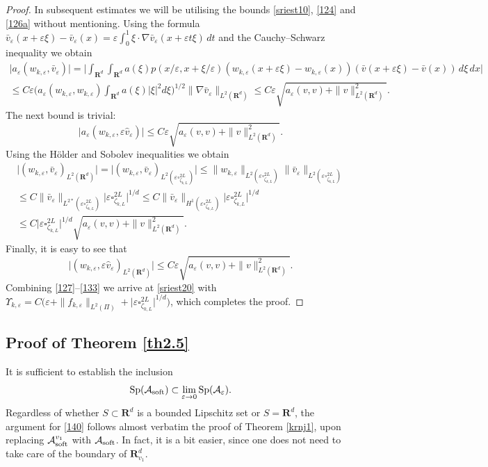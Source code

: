 \documentclass[11pt]{article}
\newcommand\e {\varepsilon}
\newcommand\soft{{\rm soft}}
\def\RR{\R}
\newcommand{\R}{\mathbf{R}}
\def\AA{\mathcal{A}}
\theoremstyle{remark}
\begin{document}
\begin{proof}
In subsequent estimates we will be utilising the bounds \eqref{sriest10}, \eqref{124} and \eqref{126a} without mentioning. Using the formula $ \bar{v}_\e (x+\e \xi)-\bar{v}_\e (x) =\e\int_0^1 \xi \cdot\nabla \bar{v}_\e (x+\e    t \xi) \,dt$ and the  Cauchy–Schwarz inequality   we obtain
	\begin{multline}
	\big| a_\e (w_{k,\e},\bar{v}_\e)\big| = \Big|	\int_{\R^d} \int_{\R^d} a(\xi)p(x/\e, x+\xi/\e)\left(w_{k,\e}(x+\e\xi )-w_{k,\e}(x) \right) \left(\bar{v}(x+\e\xi)-\bar{v}(x) \right)\,d\xi\,dx \Big|
	 \\
	 \leq C \e \Big(a_\e(w_{k,\e},w_{k,\e}) \int_{\R^d} a(\xi) |\xi|^2 d\xi\Big)^{1/2} \|\nabla\bar{v}_\e\|_{L^2(\RR^d)}\leq C \e \sqrt{a_\e (v,v)+\|v\|^2_{L^2(\RR^d)}} .
\end{multline}	
The next bound	  is  trivial:
\begin{equation}
	\big|a_\e(w_{k,\e}, \varepsilon \hat{v}_\e)\big| \leq C \e \sqrt{a_\e (v,v)+\|v\|^2_{L^2(\RR^d)}}.
\end{equation}
Using the H\"older and Sobolev inequalities we obtain
\begin{multline} %
\big| ( w_{k,\e},\bar{v}_\e   )_{L^2(\RR^d)}\big|=\big| ( w_{k,\e},\bar{v}_\e   )_{L^2(\e\square_{\zeta_{k,L}}^{2L})}\big|\leq \|w_{k,\e}\|_{L^2(\e\square_{\zeta_{k,L}}^{2L})}\|\bar{v}_\e\|_{L^2(\e\square_{\zeta_{k,L}}^{2L})}
\\
\leq C \|\bar{v}_\e\|_{L^{2*}(\e\square_{\zeta_{k,L}}^{2L})}\big|\e\square_{\zeta_{k,L}}^{2L}\big|^{1/d}\leq C \|\bar{v}_\e\|_{H^1(\e\square_{\zeta_{k,L}}^{2L})}\big|\e\square_{\zeta_{k,L}}^{2L}\big|^{1/d}
\\
\leq C  \big|\e\square_{\zeta_{k,L}}^{2L}\big|^{1/d}\sqrt{a_\e (v,v)+\|v\|^2_{L^2(\RR^d)}}.
\end{multline}
Finally, it is easy to see that
\begin{equation}\label{133}
 \big|( w_{k,\e}, \varepsilon \hat{v}_\e)_{L^2(\RR^d)}\big| \leq C \e \sqrt{a_\e (v,v)+\|v\|^2_{L^2(\RR^d)}}.
\end{equation}	
Combining \eqref{127}--\eqref{133} we arrive at \eqref{sriest20} with $\Upsilon_{k,\e} = C \Big(\e +\|f_{k,\e}\|_{L^2(\Pi)} +  \big|\e\square_{\zeta_{k,L}}^{2L}\big|^{1/d}\Big)$, which completes the proof.	
	\end{proof} 	
	
 	
	
	\subsection{Proof of Theorem \ref{th2.5}}
	It is sufficient to establish the inclusion
	\begin{equation}\label{140}
		\mathrm{Sp}(\mathcal{A}_\soft) \subset \lim_{\e \to 0} \mathrm{Sp}(\AA_\e ).
	\end{equation} 	
	Regardless of whether $S \subset \RR^d$ is a bounded Lipschitz set  or  $S=\mathbf{R}^d$, the argument for \eqref{140} follows almost verbatim the proof of Theorem \ref{krnj1}, upon replacing $\AA_\soft^{v_1}$ with $\AA_\soft$. In fact, it is a bit easier, since one does not need to take care of the boundary of  $\mathbf{R}^d_{v_1}$.
		
\end{document}
